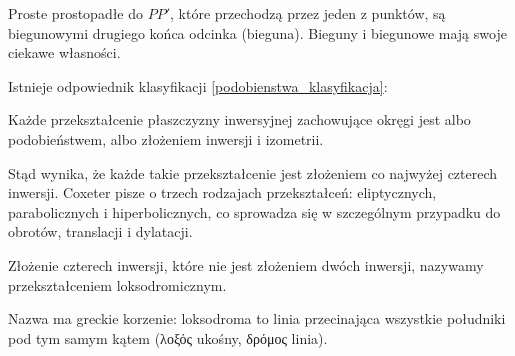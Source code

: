 Proste prostopadłe do $PP'$, które przechodzą przez jeden z punktów, są biegunowymi drugiego końca odcinka (bieguna).
Bieguny i biegunowe mają swoje ciekawe własności.


Istnieje odpowiednik klasyfikacji \ref{podobienstwa_klasyfikacja}:

\begin{proposition}
    Każde przekształcenie płaszczyzny inwersyjnej zachowujące okręgi jest albo podobieństwem, albo złożeniem inwersji i izometrii.
\end{proposition}

Stąd wynika, że każde takie przekształcenie jest złożeniem co najwyżej czterech inwersji.
Coxeter \cite[s. 108]{coxeter_1967} pisze o trzech rodzajach przekształceń: eliptycznych, parabolicznych i hiperbolicznych, co sprowadza się w szczególnym przypadku do obrotów, translacji i dylatacji.

\begin{proposition}
    Złożenie czterech inwersji, które nie jest złożeniem dwóch inwersji, nazywamy przekształceniem loksodromicznym.
\end{proposition}

Nazwa ma greckie korzenie: loksodroma to linia przecinająca wszystkie południki pod tym samym kątem (λοξός ukośny, δρόμος linia).

%